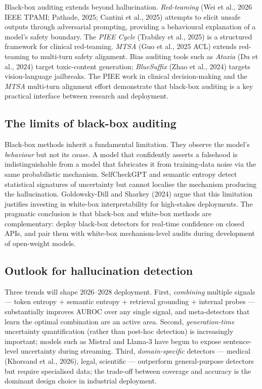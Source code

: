 Black-box auditing extends beyond hallucination. \emph{Red-teaming} (Wei et al., 2026 IEEE TPAMI; Pathade, 2025; Cantini et al., 2025) attempts to elicit unsafe outputs through adversarial prompting, providing a behavioural explanation of a model's safety boundary. The \emph{PIEE Cycle} (Trabilsy et al., 2025) is a structured framework for clinical red-teaming. \emph{MTSA} (Guo et al., 2025 ACL) extends red-teaming to multi-turn safety alignment. Bias auditing tools such as \emph{Atoxia} (Du et al., 2024) target toxic-content generation; \emph{BlueSuffix} (Zhao et al., 2024) targets vision-language jailbreaks. The PIEE work in clinical decision-making and the \emph{MTSA} multi-turn alignment effort demonstrate that black-box auditing is a key practical interface between research and deployment.

\subsection{The limits of black-box auditing}\label{the-limits-of-black-box-auditing}

Black-box methods inherit a fundamental limitation. They observe the model's \emph{behaviour} but not its \emph{cause}. A model that confidently asserts a falsehood is indistinguishable from a model that fabricates it from training-data noise via the same probabilistic mechanism. SelfCheckGPT and semantic entropy detect statistical signatures of uncertainty but cannot localise the mechanism producing the hallucination. Goldowsky-Dill and Sharkey (2024) argue that this limitation justifies investing in white-box interpretability for high-stakes deployments. The pragmatic conclusion is that black-box and white-box methods are complementary: deploy black-box detectors for real-time confidence on closed APIs, and pair them with white-box mechanism-level audits during development of open-weight models.

\subsection{Outlook for hallucination detection}\label{outlook-for-hallucination-detection}

Three trends will shape 2026--2028 deployment. First, \emph{combining} multiple signals --- token entropy + semantic entropy + retrieval grounding + internal probes --- substantially improves AUROC over any single signal, and meta-detectors that learn the optimal combination are an active area. Second, \emph{generation-time} uncertainty quantification (rather than post-hoc detection) is increasingly important; models such as Mistral and Llama-3 have begun to expose sentence-level uncertainty during streaming. Third, \emph{domain-specific} detectors --- medical (Khorsand et al., 2026), legal, scientific --- outperform general-purpose detectors but require specialised data; the trade-off between coverage and accuracy is the dominant design choice in industrial deployment.

